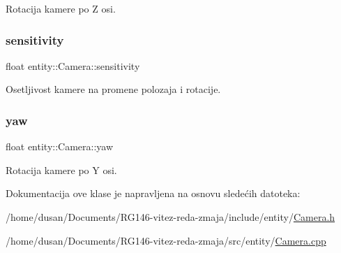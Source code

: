 Rotacija kamere po Z osi. 

\mbox{\label{classentity_1_1Camera_aae009950e0af66c4b5ed71f903b81513}} 
\subsubsection{\texorpdfstring{sensitivity}{sensitivity}}
{\footnotesize\ttfamily float entity\+::\+Camera\+::sensitivity\hspace{0.3cm}{\ttfamily [private]}}



Osetljivost kamere na promene polozaja i rotacije. 

\mbox{\label{classentity_1_1Camera_a2ebfeecc4fe70c880813f7a4671d8b63}} 
\subsubsection{\texorpdfstring{yaw}{yaw}}
{\footnotesize\ttfamily float entity\+::\+Camera\+::yaw\hspace{0.3cm}{\ttfamily [private]}}



Rotacija kamere po Y osi. 



Dokumentacija ove klase je napravljena na osnovu sledećih datoteka\+:\begin{DoxyCompactItemize}
\item 
/home/dusan/\+Documents/\+R\+G146-\/vitez-\/reda-\/zmaja/include/entity/\hyperlink{Camera_8h}{Camera.\+h}\item 
/home/dusan/\+Documents/\+R\+G146-\/vitez-\/reda-\/zmaja/src/entity/\hyperlink{Camera_8cpp}{Camera.\+cpp}\end{DoxyCompactItemize}

